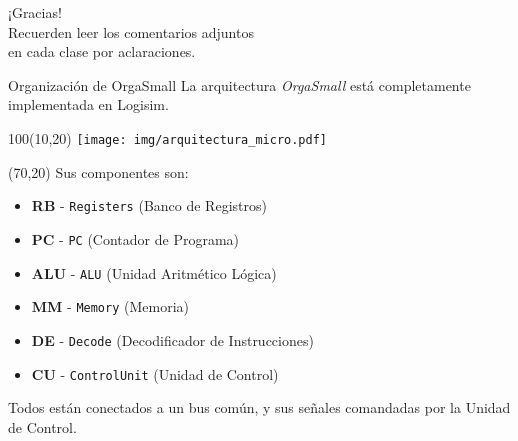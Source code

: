 \documentclass[aspectratio=169]{beamer}
\begin{document}

\begin{frame}[plain]
    \begin{center}
    \vspace{2cm}
    \huge ¡Gracias!\\
    \vspace{2cm}
    \normalsize Recuerden leer los comentarios adjuntos\\ en cada clase por aclaraciones.
    \end{center}
\end{frame}


\begin{frame}[fragile,t]{Organización de OrgaSmall}
    La arquitectura \emph{OrgaSmall} está completamente implementada en Logisim.\\
    \begin{textblock}{100}(10,20)
    \texttt{[image: img/arquitectura\_micro.pdf]}
    \end{textblock}
    \begin{textblock}{70}(70,20)
    Sus componentes son:\\
    \begin{itemize}
    \item \textbf{RB} - \texttt{Registers} (Banco de Registros)
    \item \textbf{PC} - \texttt{PC} (Contador de Programa)
    \item \textbf{ALU} - \texttt{ALU} (Unidad Aritmético Lógica)
    \item \textbf{MM} - \texttt{Memory} (Memoria)
    \item \textbf{DE} - \texttt{Decode} (Decodificador de Instrucciones)
    \item \textbf{CU} - \texttt{ControlUnit} (Unidad de Control)
    \end{itemize}
    Todos están conectados a un bus común, y sus señales comandadas por la Unidad de Control.
    \end{textblock}
\end{frame}
\end{document}

